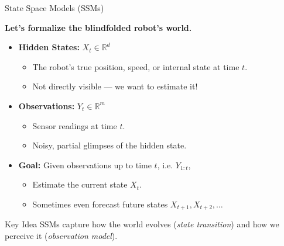 \documentclass[handout,aspectratio=169]{beamer}
\begin{document}
\begin{frame}{State Space Models (SSMs)}

\textbf{Let’s formalize the blindfolded robot’s world.}

\vspace{1em}
\begin{itemize}
  \item \textbf{Hidden States:} \( X_t \in \mathbb{R}^d \)
  \begin{itemize}
    \item The robot’s true position, speed, or internal state at time \( t \).
    \item Not directly visible — we want to estimate it!
  \end{itemize}

  \vspace{0.6em}
  \item \textbf{Observations:} \( Y_t \in \mathbb{R}^m \)
  \begin{itemize}
    \item Sensor readings at time \( t \).
    \item Noisy, partial glimpses of the hidden state.
  \end{itemize}

  \vspace{0.6em}
  \item \textbf{Goal:} Given observations up to time \( t \), i.e. \( Y_{1:t} \),
  \begin{itemize}
    \item Estimate the current state \( X_t \).
    \item Sometimes even forecast future states \( X_{t+1}, X_{t+2}, \dots \)
  \end{itemize}
\end{itemize}

\vspace{1em}
\begin{block}{Key Idea}
SSMs capture how the world evolves (\textit{state transition}) and how we perceive it (\textit{observation model}).
\end{block}

\end{frame}
\end{document}
